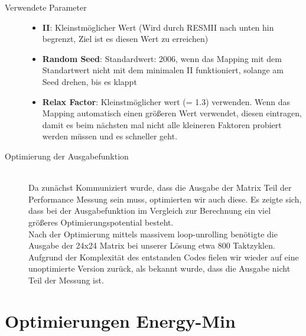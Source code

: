\documentclass[oneside,11pt,accentcolor=tud2b, nochapname]{tudexercise}
\begin{document}
\begin{description}
	\item[Verwendete Parameter] \hfill
	\begin{itemize}
		\item \textbf{II}: Kleinstmöglicher Wert (Wird durch RESMII nach unten hin begrenzt, Ziel ist es diesen Wert zu erreichen)
		\item \textbf{Random Seed}: Standardwert: 2006, wenn das Mapping mit dem Standartwert nicht mit dem minimalen II funktioniert, solange am Seed drehen, bis es klappt
		\item \textbf{Relax Factor}: Kleinstmöglicher wert (= 1.3) verwenden.
			Wenn das Mapping automatisch einen größeren Wert verwendet, diesen eintragen, damit es beim nächsten mal nicht alle kleineren Faktoren probiert werden müssen und es schneller geht.
	\end{itemize}
	
	\item[Optimierung der Ausgabefunktion] \hfill \\
	Da zunächst Kommuniziert wurde, dass die Ausgabe der Matrix Teil der Performance Messung sein muss, optimierten wir auch diese.
	Es zeigte sich, dass bei der Ausgabefunktion im Vergleich zur Berechnung ein viel größeres Optimierungspotential besteht.\\
	Nach der Optimierung mittels massivem loop-unrolling benötigte die Ausgabe der 24x24 Matrix bei unserer Lösung etwa 800 Taktzyklen.
	Aufgrund der Komplexität des entstanden Codes fielen wir wieder auf eine unoptimierte Version zurück, als bekannt wurde, dass die Ausgabe nicht Teil der Messung ist.
	
\end{description}

\section*{Optimierungen Energy-Min}
\end{document}
